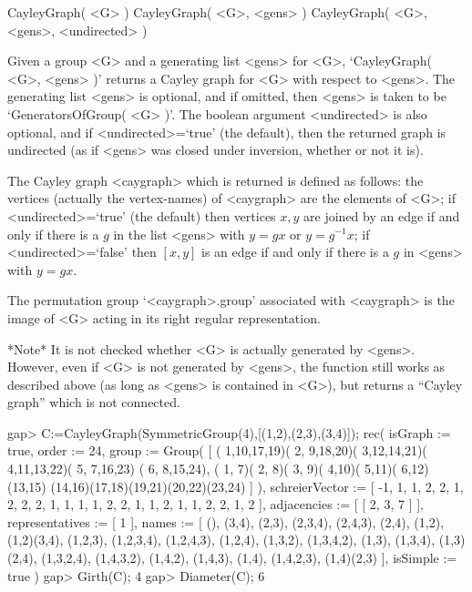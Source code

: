 
\>CayleyGraph( <G> )
\>CayleyGraph( <G>, <gens> )
\>CayleyGraph( <G>, <gens>, <undirected> )
 
Given a group <G> and a generating list <gens> for  <G>, `CayleyGraph(
<G>, <gens> )' returns a Cayley graph for  <G>  with respect to <gens>.
The generating list <gens> is optional, and if omitted, then <gens> is
taken to be `GeneratorsOfGroup( <G> )'. The boolean argument <undirected>
is also optional, and if <undirected>=`true' (the default), then the
returned graph is undirected (as if <gens> was closed under inversion,
whether or not it is).

The Cayley graph  <caygraph>  which is returned is defined as follows:
the vertices (actually the vertex-names) of <caygraph>  are the elements
of <G>;  if <undirected>=`true' (the default) then vertices $x,y$ are
joined by an edge if and only if there is a $g$ in the list <gens> with
$y=gx$ or $y=g^{-1}x$; if <undirected>=`false' then $[x,y]$ is an edge
if and only if there is a $g$ in <gens> with $y=gx$.

The permutation group `<caygraph>.group' associated with <caygraph> is
the image of <G> acting in its right regular representation.

*Note* It is not checked whether <G> is actually generated by <gens>.
However, even if <G> is not generated by <gens>, the function still
works as described above (as long as <gens> is contained in <G>), but
returns a ``Cayley graph'' which is not connected.

\beginexample
gap> C:=CayleyGraph(SymmetricGroup(4),[(1,2),(2,3),(3,4)]);
rec(
  isGraph := true,
  order := 24,
  group :=
   Group( [ ( 1,10,17,19)( 2, 9,18,20)( 3,12,14,21)( 4,11,13,22)( 5, 7,16,23)
        ( 6, 8,15,24), ( 1, 7)( 2, 8)( 3, 9)( 4,10)( 5,11)( 6,12)(13,15)
        (14,16)(17,18)(19,21)(20,22)(23,24) ] ),
  schreierVector := [ -1, 1, 1, 2, 2, 1, 2, 2, 2, 1, 1, 1, 1, 2, 2, 1, 1, 2,
      1, 1, 2, 2, 1, 2 ],
  adjacencies := [ [ 2, 3, 7 ] ],
  representatives := [ 1 ],
  names := [ (), (3,4), (2,3), (2,3,4), (2,4,3), (2,4), (1,2), (1,2)(3,4),
      (1,2,3), (1,2,3,4), (1,2,4,3), (1,2,4), (1,3,2), (1,3,4,2), (1,3),
      (1,3,4), (1,3)(2,4), (1,3,2,4), (1,4,3,2), (1,4,2), (1,4,3), (1,4),
      (1,4,2,3), (1,4)(2,3) ],
  isSimple := true )
gap> Girth(C);
4
gap> Diameter(C);
6
\endexample


